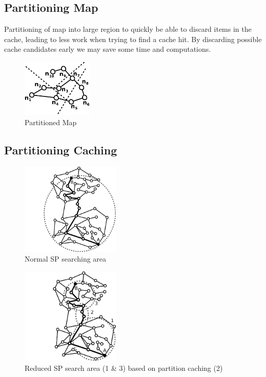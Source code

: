 \subsection{Partitioning Map}

Partitioning of map into large region to quickly be able to discard items in the cache, leading to less work when trying to find a cache hit. By discarding possible \spath cache candidates early we may save some time and computations.


\begin{figure}
  \center
	\includegraphics[width=0.30\textwidth]{figures/mapPartition.pdf}
	\caption{Partitioned Map}
  \label{fig:mappartition}
\end{figure}

\subsection{Partitioning Caching} 

\begin{figure}
  \center
	\includegraphics[width=0.42\textwidth]{figures/partSPcacheB.pdf}
	\caption{Normal SP searching area}
  \label{fig:cachestruc}
\end{figure}

\begin{figure}
  \center
	\includegraphics[width=0.42\textwidth]{figures/partSPcacheA.pdf}
	\caption{Reduced SP search area (1 \& 3) based on partition caching (2)}
  \label{fig:cachestruc}
\end{figure}



